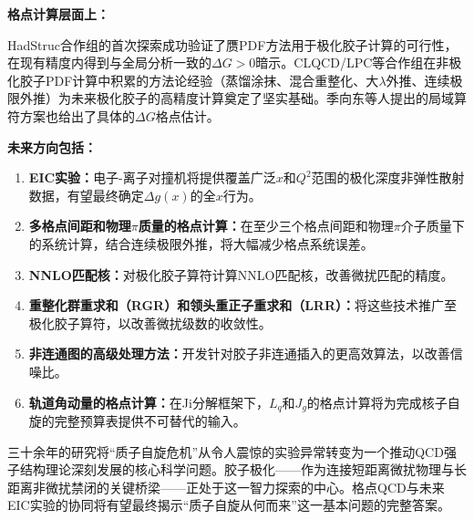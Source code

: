 \documentclass[12pt,a4paper]{ctexart}
\theoremstyle{definition}
\begin{document}
\textbf{格点计算层面上：}

HadStruc合作组的首次探索\cite{Egerer2022}成功验证了赝PDF方法用于极化胶子计算的可行性，在现有精度内得到与全局分析一致的$\Delta G > 0$暗示。CLQCD/LPC等合作组在非极化胶子PDF计算中积累的方法论经验\cite{Chen2025gluon}（蒸馏涂抹、混合重整化、大$\lambda$外推、连续极限外推）为未来极化胶子的高精度计算奠定了坚实基础。季向东等人提出的局域算符方案\cite{Ji2013gluon}也给出了具体的$\Delta G$格点估计。

\textbf{未来方向包括：}

\begin{enumerate}
    \item \textbf{EIC实验：}电子-离子对撞机将提供覆盖广泛$x$和$Q^2$范围的极化深度非弹性散射数据，有望最终确定$\Delta g(x)$的全$x$行为\cite{Egerer2022}。
    \item \textbf{多格点间距和物理$\pi$质量的格点计算：}在至少三个格点间距和物理$\pi$介子质量下的系统计算，结合连续极限外推，将大幅减少格点系统误差。
    \item \textbf{NNLO匹配核：}对极化胶子算符计算NNLO匹配核，改善微扰匹配的精度。
    \item \textbf{重整化群重求和（RGR）和领头重正子重求和（LRR）：}将这些技术推广至极化胶子算符，以改善微扰级数的收敛性\cite{Zhang2023RGR,Su2023LRR}。
    \item \textbf{非连通图的高级处理方法：}开发针对胶子非连通插入的更高效算法，以改善信噪比。
    \item \textbf{轨道角动量的格点计算：}在Ji分解框架下，$L_q$和$J_g$的格点计算将为完成核子自旋的完整预算表提供不可替代的输入。
\end{enumerate}

三十余年的研究将``质子自旋危机''从令人震惊的实验异常转变为一个推动QCD强子结构理论深刻发展的核心科学问题。胶子极化——作为连接短距离微扰物理与长距离非微扰禁闭的关键桥梁——正处于这一智力探索的中心。格点QCD与未来EIC实验的协同将有望最终揭示``质子自旋从何而来''这一基本问题的完整答案。
\end{document}
